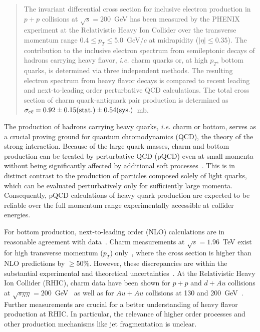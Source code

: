 \documentclass[aps,prl,superscriptaddress,showpacs,floatfix,twocolumn]{revtex4}
\begin{document}
\date{\today}

\begin{abstract}
The invariant differential cross section for inclusive electron production in
$p + p$ collisions at $\sqrt{s} = 200$~GeV has been measured by the PHENIX 
experiment at the Relativistic Heavy Ion Collider over the transverse momentum
range $0.4 \le p_T \le 5.0$~GeV/$c$ at midrapidity ($|\eta| \le 0.35$). 
The contribution to the inclusive electron spectrum from semileptonic decays 
of hadrons carrying heavy flavor, {\it i.e.} charm quarks or, at high $p_T$, 
bottom quarks, is determined via three independent methods. 
The resulting electron spectrum from heavy flavor decays is compared to 
recent leading and next-to-leading order perturbative QCD calculations. 
The total cross section of charm quark-antiquark pair production is determined 
as 
$\sigma_{c\bar{c}} = 0.92 \pm 0.15 {\rm (stat.)} \pm 0.54 {\rm (sys.)}$~mb.
\end{abstract}


\maketitle

The production of hadrons carrying heavy quarks, {\it i.e.} charm or bottom, 
serves as a crucial proving ground for quantum chromodynamics (QCD), the 
theory of the strong interaction. 
Because of the large quark masses, charm and bottom production can be treated 
by perturbative QCD (pQCD) even at small momenta without being significantly
affected by additional soft processes~\cite{mangano93}. 
This is in distinct contrast to the production of particles composed solely of
light quarks, which can be evaluated perturbatively only for sufficiently 
large momenta.
Consequently, pQCD calculations of heavy quark production are expected to be 
reliable over the full momentum range experimentally accessible at collider 
energies.

For bottom production, next-to-leading order (NLO) calculations are in 
reasonable agreement with data~\cite{cacciari04mangano04}.
Charm measurements at $\sqrt{s} = 1.96$~TeV exist for high transverse momentum 
($p_T$) only~\cite{acosta03}, where the cross section is higher than NLO 
predictions by $\ge 50$\%.
However, these discrepancies are within the substantial experimental and 
theoretical uncertainties~\cite{acosta03}.
At the Relativistic Heavy Ion Collider (RHIC), charm data have been shown for
$p + p$  and $d + Au$ collisions at 
$\sqrt{s_{NN}} = 200$~GeV~\cite{star_dau,phenix_dau} as well as for $Au + Au$ 
collisions at 130 and 200~GeV~\cite{phenix_auau130,phenix_auau200}.
Further measurements are crucial for a better understanding of heavy flavor 
production at RHIC. 
In particular, the relevance of higher order processes and other production 
mechanisms like jet fragmentation is unclear.
\end{document}
